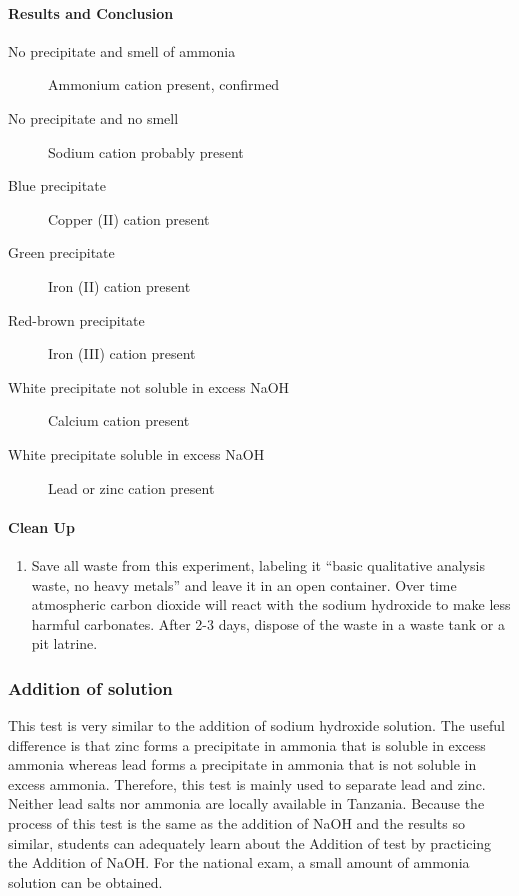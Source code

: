 \paragraph{Results and Conclusion}
\begin{description}
\item[No precipitate and smell of ammonia]{Ammonium cation present, confirmed}
\item[No precipitate and no smell]{Sodium cation probably present}
\item[Blue precipitate]{Copper (II) cation present}
\item[Green precipitate]{Iron (II) cation present}
\item[Red-brown precipitate]{Iron (III) cation present}
\item[White precipitate not soluble in excess NaOH]{Calcium cation present}
\item[White precipitate soluble in excess NaOH]{Lead or zinc cation present}
\end{description}

\paragraph{Clean Up}
\begin{enumerate}
\item{Save all waste from this experiment, labeling it ``basic qualitative analysis waste, no heavy metals'' and leave it in an open container. Over time atmospheric carbon dioxide will react with the sodium hydroxide to make less harmful carbonates. After 2-3 days, dispose of the waste in a waste tank or a pit latrine.}
\end{enumerate}

\subsubsection{Addition of \texorpdfstring{}{NH3} solution}

This test is very similar to the addition of sodium hydroxide solution. The useful difference is that zinc forms a precipitate in ammonia that is soluble in excess ammonia whereas lead forms a precipitate in ammonia that is not soluble in excess ammonia. Therefore, this test is mainly used to separate lead and zinc. Neither lead salts nor ammonia are locally available in Tanzania. Because the process of this test is the same as the addition of NaOH and the results so similar, students can adequately learn about the Addition of  test by practicing the Addition of NaOH. For the national exam, a small amount of ammonia solution can be obtained.

